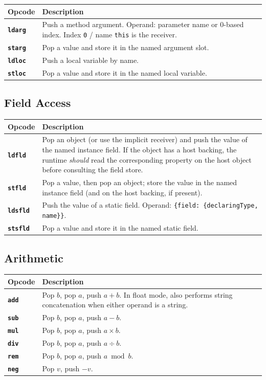 \documentclass[11pt,a4paper]{article}
\newcommand{\code}[1]{\texttt{\small #1}}
\newcommand{\opcode}[1]{\textbf{\texttt{#1}}}
\begin{document}
\begin{longtable}{lp{10.5cm}}
  \toprule
  \textbf{Opcode} & \textbf{Description} \\
  \midrule
  \endhead
  \opcode{ldarg}  &
    Push a method argument.
    Operand: parameter name or 0-based index.
    Index \texttt{0} / name \texttt{this} is the receiver. \\
  \opcode{starg}  & Pop a value and store it in the named argument slot. \\
  \opcode{ldloc}  & Push a local variable by name. \\
  \opcode{stloc}  & Pop a value and store it in the named local variable. \\
  \bottomrule
\end{longtable}

\subsection{Field Access}

\begin{longtable}{lp{10.5cm}}
  \toprule
  \textbf{Opcode} & \textbf{Description} \\
  \midrule
  \endhead
  \opcode{ldfld}  &
    Pop an object (or use the implicit receiver) and push the value of the
    named instance field. If the object has a host backing, the runtime
    \textit{should} read the corresponding property on the host object
    before consulting the field store. \\
  \opcode{stfld}  &
    Pop a value, then pop an object; store the value in the named instance
    field (and on the host backing, if present). \\
  \opcode{ldsfld} &
    Push the value of a static field.
    Operand: \code{\{field: \{declaringType, name\}\}}. \\
  \opcode{stsfld} & Pop a value and store it in the named static field. \\
  \bottomrule
\end{longtable}

\subsection{Arithmetic}

\begin{longtable}{lp{10.5cm}}
  \toprule
  \textbf{Opcode} & \textbf{Description} \\
  \midrule
  \endhead
  \opcode{add} &
    Pop $b$, pop $a$, push $a + b$.
    In float mode, also performs string concatenation when either operand
    is a string. \\
  \opcode{sub} & Pop $b$, pop $a$, push $a - b$. \\
  \opcode{mul} & Pop $b$, pop $a$, push $a \times b$. \\
  \opcode{div} & Pop $b$, pop $a$, push $a \div b$. \\
  \opcode{rem} & Pop $b$, pop $a$, push $a \bmod b$. \\
  \opcode{neg} & Pop $v$, push $-v$. \\
  \bottomrule
\end{longtable}
\end{document}

